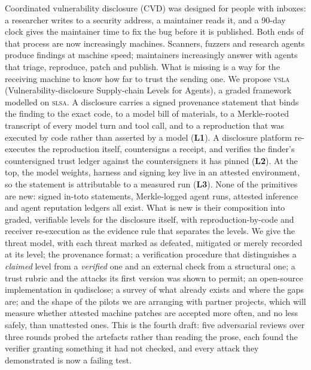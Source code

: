 \documentclass[11pt]{article}
\newcommand{\vsla}{\textsc{vsla}}
\newcommand{\slsa}{\textsc{slsa}}
\newcommand{\lvl}[1]{\textbf{L#1}}
\begin{document}
\noindent\begin{minipage}{\textwidth}
{\linespread{1.06}\selectfont
Coordinated vulnerability disclosure (CVD) was designed for people with inboxes: a researcher writes to a
security address, a maintainer reads it, and a 90-day clock gives the maintainer time to fix the bug before
it is published. Both ends of that process are now increasingly machines. Scanners, fuzzers and research
agents produce findings at machine speed; maintainers increasingly answer with agents that triage, reproduce,
patch and publish. What is missing is a way for the receiving machine to know how far to trust the sending
one. We propose \vsla{} (Vulnerability-disclosure Supply-chain Levels for Agents), a graded framework modelled
on \slsa{}. A disclosure carries a signed provenance statement that binds the finding to the exact code, to a
model bill of materials, to a Merkle-rooted transcript of every model turn and tool call, and to a reproduction
that was executed by code rather than asserted by a model (\lvl{1}). A disclosure platform re-executes the
reproduction itself, countersigns a receipt, and verifies the finder's countersigned trust ledger against the
countersigners it has pinned (\lvl{2}). At the top, the model weights, harness and signing key live in an
attested environment, so the statement is attributable to a measured run (\lvl{3}). None of the primitives are new: signed in-toto statements, Merkle-logged agent runs, attested inference and agent
reputation ledgers all exist. What is new is their composition into graded, verifiable levels for the disclosure
itself, with reproduction-by-code and receiver re-execution as the evidence rule that separates the levels. We
give the threat model, with each threat marked as defeated, mitigated or merely recorded at its level; the
provenance format; a verification procedure that distinguishes a \emph{claimed} level from a \emph{verified} one
and an external check from a structural one; a trust rubric and the attacks its first version was shown to
permit; an open-source implementation in qudisclose; a survey of what already exists and where the gaps are;
and the shape of the pilots we are arranging with partner projects, which will measure whether attested machine
patches are accepted more often, and no less safely, than unattested ones. This is the fourth draft: five adversarial reviews over three rounds probed the artefacts rather than reading the
prose, each found the verifier granting something it had not checked, and every attack they demonstrated is now a
failing test.
\par}
\end{minipage}
\end{document}
